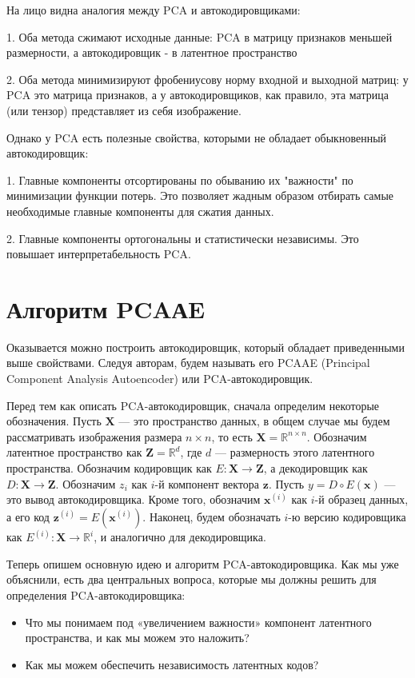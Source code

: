 \documentclass{article}
\begin{document}
На лицо видна аналогия между PCA и автокодировщиками: 

1. Оба метода сжимают исходные данные: PCA в матрицу признаков меньшей размерности, а автокодировщик - в латентное пространство

2. Оба метода минимизируют фробениусову норму входной и выходной матриц: у PCA это матрица признаков, а у автокодировщиков, как правило, эта матрица (или тензор) представляет из себя изображение.

Однако у PCA есть полезные свойства, которыми не обладает обыкновенный автокодировщик: 

1. Главные компоненты отсортированы по обыванию их "важности" по минимизации функции потерь. Это позволяет жадным образом отбирать самые необходимые главные компоненты для сжатия данных.

2. Главные компоненты ортогональны и статистически независимы. Это повышает интерпретабельность PCA.



\section{Алгоритм PCAАE}

Оказывается можно построить автокодировщик, который обладает приведенными выше свойствами. Следуя авторам, будем называть его PCAAE (Principal Component Analysis Autoencoder) или PCA-автокодировщик.

Перед тем как описать PCA-автокодировщик, сначала определим некоторые обозначения. Пусть \( \mathbf{X} \) — это пространство данных, в общем случае мы будем рассматривать изображения размера \( n \times n \), то есть \( \mathbf{X} = \mathbb{R}^{n \times n} \). Обозначим латентное пространство как \( \mathbf{Z} = \mathbb{R}^d \), где \( d \) — размерность этого латентного пространства. Обозначим кодировщик как \( E: \mathbf{X} \to \mathbf{Z} \), а декодировщик как \( D: \mathbf{X} \to \mathbf{Z} \). Обозначим \( z_i \) как \( i \)-й компонент вектора \( \mathbf{z} \). Пусть \( y = D \circ E(\mathbf{x}) \) — это вывод автокодировщика. Кроме того, обозначим \( \mathbf{x}^{(i)} \) как \( i \)-й образец данных, а его код \( \mathbf{z}^{(i)} = E(\mathbf{x}^{(i)}) \). Наконец, будем обозначать \( i \)-ю версию кодировщика как \( E^{(i)}: \mathbf{X} \to \mathbb{R}^i \), и аналогично для декодировщика.

Теперь опишем основную идею и алгоритм PCA-автокодировщика. Как мы уже объяснили, есть два центральных вопроса, которые мы должны решить для определения PCA-автокодировщика:
\begin{itemize}
    \item Что мы понимаем под «увеличением важности» компонент латентного пространства, и как мы можем это наложить?
    \item Как мы можем обеспечить независимость латентных кодов?
\end{itemize}
\end{document}
